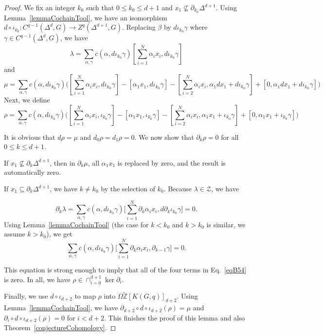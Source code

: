 \documentclass[10pt,a4paper]{amsart}
\newcommand{\tZ}{{\widetilde{\mathbb Z}}}
\begin{document}
\begin{proof}
	We fix an integer $k_0$ such that $0\le k_0\le d+1$ and $x_1\nsubseteq \partial_{k_0}\Delta^{d+1}$. Using Lemma~\ref{lemmaCochainTool}, we have an isomorphism $d\circ \iota_{k_0}:C^{q-1}(\Delta^{d},G)\rightarrow Z^q(\Delta^{d+1},G)$. Replacing $\beta$ by $d \iota_{k_0}\gamma$ where $\gamma\in C^{q-1}(\Delta^{d},G)$, we have
	\begin{equation}
		\lambda=\sum_{\alpha,\gamma} c(\alpha,d \iota_{k_0}\gamma)[\sum_{i=1}^N \alpha_ix_i,d \iota_{k_0}\gamma]
	\end{equation}
	and
	\begin{equation}
		\mu=\sum_{\alpha,\gamma} c(\alpha,d \iota_{k_0}\gamma)\bigg([\sum_{i=1}^N \alpha_ix_i,d \iota_{k_0}\gamma]-[\alpha_1x_1,d \iota_{k_0}\gamma]-[\sum_{i=2}^N \alpha_ix_i,\alpha_1dx_1+d \iota_{k_0}\gamma]+[0,\alpha_1dx_1+d \iota_{k_0}\gamma]\bigg)
	\end{equation}
	Next, we define
	\begin{equation}\label{eqB54}
		\rho=\sum_{\alpha,\gamma} c(\alpha, d\iota_{k_0}\gamma)\bigg([\sum_{i=1}^N \alpha_ix_i, \iota_{k_0}\gamma]-[\alpha_1x_1, \iota_{k_0}\gamma]-[\sum_{i=2}^N \alpha_ix_i,\alpha_1x_1+ \iota_{k_0}\gamma]+[0,\alpha_1x_1+ \iota_{k_0}\gamma]\bigg)
	\end{equation}
	
	It is obvious that $d\rho=\mu$ and $d_0\rho=d_1\rho=0$. We now show that $\partial_k\rho=0$ for all $0\le k\le d+1$.
	
	
	If $x_1\nsubseteq \partial_{k}\Delta^{d+1}$, then in $\partial_k\mu$, all $\alpha_1x_1$ is replaced by zero, and the result is automatically zero.
	
	If $x_1\subseteq \partial_{k}\Delta^{d+1}$, we have $k\ne k_0$ by the selection of $k_0$. Because $\lambda\in\mathcal{Z}$, we have
	
	\begin{equation}
		\partial_k\lambda=\sum_{\alpha,\gamma} c(\alpha,d \iota_{k_0}\gamma)\bigg[\sum_{i=1}^N\partial_k \alpha_ix_i,d\partial_k\iota_{k_0}\gamma\bigg]=0.
	\end{equation}
	Using Lemma~\ref{lemmaCochainTool} (the case for $k<k_0$ and $k>k_0$ is similar, we assume $k>k_0$), we get
	\begin{equation}
		\sum_{\alpha,\gamma} c(\alpha,d \iota_{k_0}\gamma)\bigg[\sum_{i=1}^N\partial_k \alpha_ix_i,\partial_{k-1}\gamma\bigg]=0.
	\end{equation}
	
	This equation is strong enough to imply that all of the four terms in Eq.~\eqref{eqB54} is zero. In all, we have $\rho\in \cap_{i=0}^{d+1}\ker \partial_i$.
	
	Finally, we use $d\circ \iota_{d+2}$ to map $\rho$ into $\Omega\tZ[K(G,q)]_{d+2}$. Using Lemma~\ref{lemmaCochainTool}, we have $\partial_{d+2}\circ d\circ \iota_{d+2}(\rho)=\mu$ and $\partial_{i}\circ d\circ \iota_{d+2}(\rho)=0$ for $i<d+2$.
	This finishes the proof of this lemma and also Theorem~\ref{conjectureCohomology}.
\end{proof}
\end{document}
